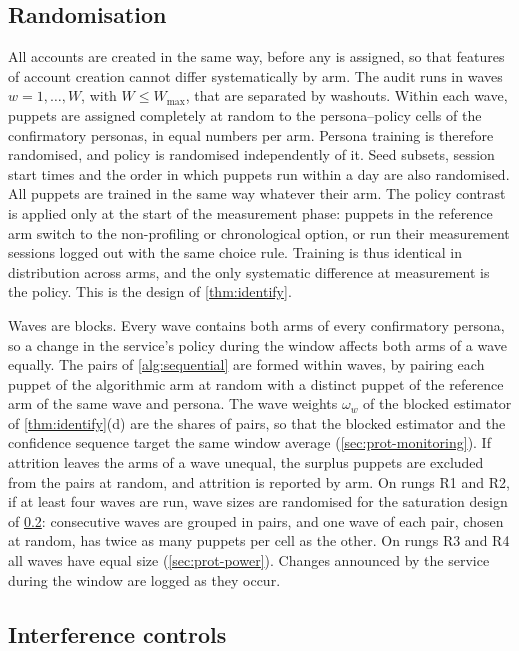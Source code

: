 \subsection{Randomisation}\label{sec:prot-randomisation}

All accounts are created in the same way, before any is assigned, so that features of account creation cannot differ systematically by arm. The audit runs in waves $w=1,\dots,W$, with $W\le W_{\max}$, that are separated by washouts. Within each wave, puppets are assigned completely at random to the persona--policy cells of the confirmatory personas, in equal numbers per arm. Persona training is therefore randomised, and policy is randomised independently of it. Seed subsets, session start times and the order in which puppets run within a day are also randomised. All puppets are trained in the same way whatever their arm. The policy contrast is applied only at the start of the measurement phase: puppets in the reference arm switch to the non-profiling or chronological option, or run their measurement sessions logged out with the same choice rule. Training is thus identical in distribution across arms, and the only systematic difference at measurement is the policy. This is the design of \cref{thm:identify}.

Waves are blocks. Every wave contains both arms of every confirmatory persona, so a change in the service's policy during the window affects both arms of a wave equally. The pairs of \cref{alg:sequential} are formed within waves, by pairing each puppet of the algorithmic arm at random with a distinct puppet of the reference arm of the same wave and persona. The wave weights $\omega_w$ of the blocked estimator of \cref{thm:identify}(d) are the shares of pairs, so that the blocked estimator and the confidence sequence target the same window average (\cref{sec:prot-monitoring}). If attrition leaves the arms of a wave unequal, the surplus puppets are excluded from the pairs at random, and attrition is reported by arm. On rungs R1 and R2, if at least four waves are run, wave sizes are randomised for the saturation design of \cref{sec:prot-interference}: consecutive waves are grouped in pairs, and one wave of each pair, chosen at random, has twice as many puppets per cell as the other. On rungs R3 and R4 all waves have equal size (\cref{sec:prot-power}). Changes announced by the service during the window are logged as they occur.

\subsection{Interference controls}\label{sec:prot-interference}

